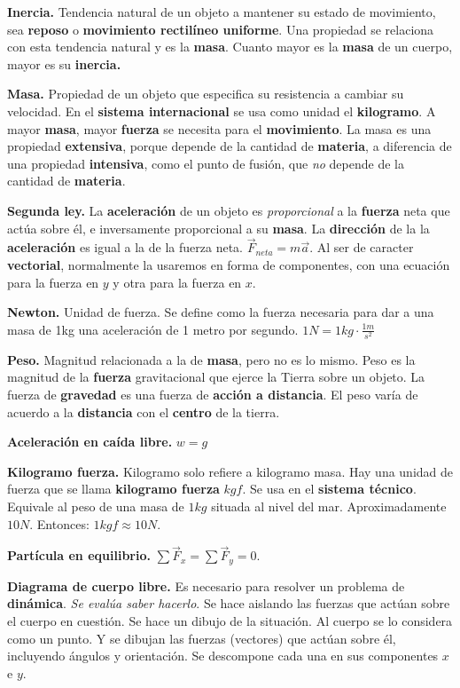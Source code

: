 \documentclass{article}
\begin{document}
\textbf{Inercia.} Tendencia natural de un objeto a mantener su estado de 
movimiento, sea \textbf{reposo} o \textbf{movimiento rectilíneo uniforme}. Una 
propiedad se relaciona con esta tendencia natural y es la \textbf{masa}. Cuanto
mayor es la \textbf{masa} de un cuerpo, mayor es su \textbf{inercia.}

\textbf{Masa.} Propiedad de un objeto que especifica su resistencia a cambiar su
velocidad. En el \textbf{sistema internacional} se usa como unidad el 
\textbf{kilogramo}. A mayor \textbf{masa}, mayor \textbf{fuerza} se necesita 
para el \textbf{movimiento}. La masa es una propiedad \textbf{extensiva}, porque
depende de la cantidad de \textbf{materia}, a diferencia de una propiedad 
\textbf{intensiva}, como el punto de fusión, que \textit{no} depende de la 
cantidad de \textbf{materia}.

\textbf{Segunda ley.} La \textbf{aceleración} de un objeto es 
\textit{proporcional} a la \textbf{fuerza} neta que actúa sobre él, e 
inversamente proporcional a su \textbf{masa}. La \textbf{dirección} de la 
la \textbf{aceleración} es igual a la de la fuerza neta. 
\(\vec{F}_{neta} = m\vec{a}\). Al ser de caracter \textbf{vectorial}, 
normalmente la usaremos en forma de componentes, con una ecuación para la fuerza
en \(y\) y otra para la fuerza en \(x\).

\textbf{Newton.} Unidad de fuerza. Se define como la fuerza necesaria para dar a
una masa de 1kg una aceleración de 1 metro por segundo. 
\(1N = 1kg \cdot \frac{1m}{s^2}\)

\textbf{Peso.} Magnitud relacionada a la de \textbf{masa}, pero no es lo mismo.
Peso es la magnitud de la \textbf{fuerza} gravitacional que ejerce la Tierra 
sobre un objeto. La fuerza de \textbf{gravedad} es una fuerza de 
\textbf{acción a distancia}. El peso varía de acuerdo a la \textbf{distancia} 
con el \textbf{centro} de la tierra.

\textbf{Aceleración en caída libre.} \(w = g\)

\textbf{Kilogramo fuerza.} Kilogramo solo refiere a kilogramo masa. Hay una 
unidad de fuerza que se llama \textbf{kilogramo fuerza} \(kgf\). Se usa en el
\textbf{sistema técnico}. Equivale al peso de una masa de \(1kg\) situada al 
nivel del mar. Aproximadamente \(10N\). Entonces: \(1kgf \approx 10N\).

\textbf{Partícula en equilibrio.} \(\sum\vec{F}_x = \sum\vec{F}_y = 0\).

\textbf{Diagrama de cuerpo libre.} Es necesario para resolver un problema de 
\textbf{dinámica}. \textit{Se evalúa saber hacerlo}. Se hace aislando las 
fuerzas que actúan sobre el cuerpo en cuestión. Se hace un dibujo de la 
situación. Al cuerpo se lo considera como un punto. Y se dibujan las fuerzas 
(vectores) que actúan sobre él, incluyendo ángulos y orientación. Se descompone
cada una en sus componentes \(x\) e \(y\).
\end{document}

